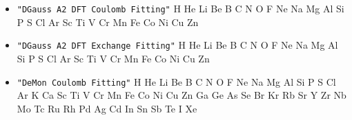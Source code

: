 \begin{itemize}
\item \verb#"DGauss A2 DFT Coulomb Fitting"# \newline
 H He Li Be B C N O F Ne Na Mg Al Si P S Cl Ar Sc Ti V Cr Mn Fe Co Ni Cu
 Zn

\item \verb#"DGauss A2 DFT Exchange Fitting"# \newline
 H He Li Be B C N O F Ne Na Mg Al Si P S Cl Ar Sc Ti V Cr Mn Fe Co Ni Cu
 Zn

\item \verb#"DeMon Coulomb Fitting"# \newline
 H He Li Be B C N O F Ne Na Mg Al Si P S Cl Ar K Ca Sc Ti V Cr Mn Fe Co
 Ni Cu Zn Ga Ge As Se Br Kr Rb Sr Y Zr Nb Mo Tc Ru Rh Pd Ag Cd In Sn Sb
 Te I Xe

\end{itemize}

\fussy

